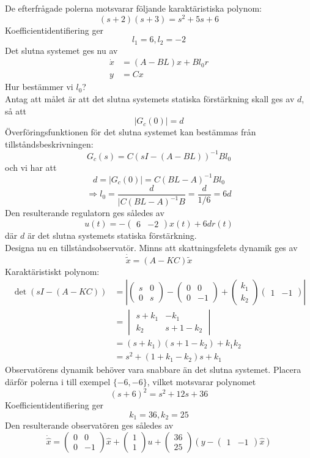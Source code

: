 \documentclass[12pt]{article}
\begin{document}
De efterfrågade polerna motsvarar följande karaktäristiska polynom: 
\[(s+2)(s+3) = s^2+5s+6\]
Koefficientidentifiering ger 
\[l_1 = 6, l_2 = -2\]
Det slutna systemet ges nu av 
\begin{align*}
  \dot{x} &= (A-BL)x + Bl_0r \\
  y &= Cx
\end{align*}
Hur bestämmer vi $l_0$? \\

Antag att målet är att det slutna systemets statiska förstärkning skall ges av $d$, så att 
\[|G_c(0)| = d\]
Överföringsfunktionen för det slutna systemet kan bestämmas från tillståndsbeskrivningen: 
\[G_c(s) = C(sI-(A-BL))^{-1}Bl_0\]
och vi har att 
\[d = |G_c(0)| = C(BL-A)^{-1}Bl_0\] 
\[\Rightarrow l_0 = \frac{d}{|C(BL-A)^{-1}B} = \frac{d}{1/6} = 6d\]
Den resulterande regulatorn ges således av 
\[u(t) = -\begin{pmatrix}
6 & -2
\end{pmatrix}x(t) + 6dr(t)\]
där $d$ är det slutna systemets statiska förstärkning. \\

Designa nu en tillståndsobservatör. Minns att skattningsfelets dynamik ges av 
\[\dot{\tilde{x}} = (A-KC)\tilde{x}\]
Karaktäristiskt polynom:
\begin{align*}
  \det{(sI-(A-KC))} &= \left|
\begin{pmatrix}
s & 0 \\
0 & s
\end{pmatrix} - \begin{pmatrix}
0 & 0\\
0 & -1
\end{pmatrix} + \begin{pmatrix}
k_1 \\
k_2
\end{pmatrix} \begin{pmatrix}
1 & -1
\end{pmatrix}\right| \\
  &= \begin{vmatrix}
s+k_1 & -k_1 \\
k_2 & s+1-k_2
\end{vmatrix} \\
&= (s+k_1)(s+1-k_2)+k_1k_2 \\
&= s^2+(1+k_1-k_2)s+k_1
\end{align*}
Observatörens dynamik behöver vara snabbare än det slutna systemet. Placera därför polerna i till exempel $\lbrace -6, -6 \rbrace$, vilket motsvarar polynomet 
\[(s+6)^2 = s^2+12s+36\]
Koefficientidentifiering ger 
\[k_1 = 36, k_2 = 25\]
Den resulterande observatören ges således av 
\[\dot{\hat{x}} = \begin{pmatrix}
0 & 0\\
0 & -1
\end{pmatrix}\hat{x} + \begin{pmatrix}
1 \\
1
\end{pmatrix}u + \begin{pmatrix}
36 \\
25
\end{pmatrix}(y-\begin{pmatrix}
1 & -1
\end{pmatrix}\hat{x})\]
\end{document}
